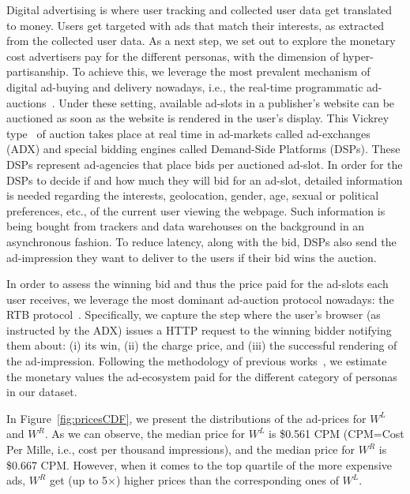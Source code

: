 \documentclass{article}
\newcommand{\leftPrices}{\$0.561\xspace}
\newcommand{\rightPrices}{\$0.667\xspace}
\newcommand{\diffPrices}{5$\times$\xspace}
\begin{document}
Digital advertising is where user tracking and collected user data get translated to money.
Users get targeted with ads that match their interests, as extracted from the collected user data.  
As a next step, we set out to explore the monetary cost advertisers pay for the different personas, with the dimension of hyper-partisanship.
To achieve this, we leverage the most prevalent mechanism of digital ad-buying and delivery nowadays, i.e., the real-time programmatic ad-auctions~\cite{programmaticAd}.
Under these setting, available ad-slots in a publisher's website can be auctioned as soon as the website is rendered in the user's display.
This Vickrey type~\cite{vickrey1961counterspeculation} of auction takes place at real time in ad-markets called ad-exchanges (ADX) and special bidding engines called Demand-Side Platforms (DSPs).
These DSPs represent ad-agencies that place bids per auctioned ad-slot.
In order for the DSPs to decide if and how much they will bid for an ad-slot, detailed information is needed regarding the interests, geolocation, gender, age, sexual or political preferences, etc., of the current user viewing the webpage.
Such information is being bought from trackers and data warehouses on the background in an asynchronous fashion. 
To reduce latency, along with the bid, DSPs also send the ad-impression they want to deliver to the users if their bid wins the auction.

In order to assess the winning bid and thus the price paid for the ad-slots each user receives, we leverage the most dominant ad-auction protocol nowadays: the RTB protocol~\cite{RTB}. %
Specifically, we capture the step where the user's browser (as instructed by the ADX) issues a HTTP request to the winning bidder notifying them about: (i) its win, (ii) the charge price, and (iii) the successful rendering of the ad-impression.
Following the methodology of previous works~\cite{papadopoulos2017if,castelluccia2014selling}, we estimate the monetary values the ad-ecosystem paid for the different category of personas in our dataset.

In Figure~\ref{fig:pricesCDF}, we present the distributions of the ad-prices for $W^L$ and $W^R$.
As we can observe, the median price for $W^L$ is \leftPrices CPM (CPM=Cost Per Mille, i.e., cost per thousand impressions), and the median price for $W^R$ is \rightPrices CPM.
However, when it comes to the top quartile of the more expensive ads, $W^R$ get (up to \diffPrices) higher prices than the corresponding ones of $W^L$.
\end{document}
